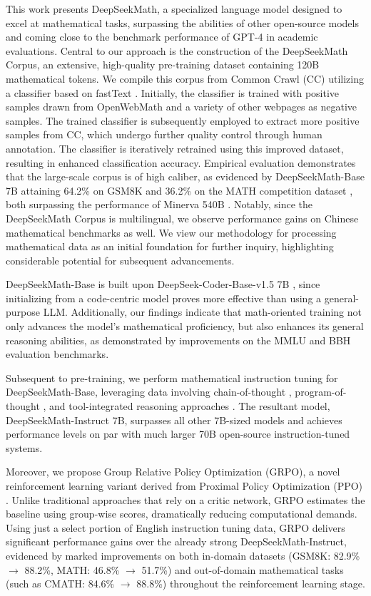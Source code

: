 This work presents DeepSeekMath, a specialized language model designed to excel at mathematical tasks, surpassing the abilities of other open-source models and coming close to the benchmark performance of GPT-4 in academic evaluations. Central to our approach is the construction of the DeepSeekMath Corpus, an extensive, high-quality pre-training dataset containing 120B mathematical tokens. We compile this corpus from Common Crawl (CC) utilizing a classifier based on fastText \citep{joulin2016fasttext}. Initially, the classifier is trained with positive samples drawn from OpenWebMath \citep{openwebmath} and a variety of other webpages as negative samples. The trained classifier is subsequently employed to extract more positive samples from CC, which undergo further quality control through human annotation. The classifier is iteratively retrained using this improved dataset, resulting in enhanced classification accuracy. Empirical evaluation demonstrates that the large-scale corpus is of high caliber, as evidenced by DeepSeekMath-Base 7B attaining 64.2\% on GSM8K \citep{gsm8k} and 36.2\% on the MATH competition dataset \citep{MATH}, both surpassing the performance of Minerva 540B \citep{minerva}. Notably, since the DeepSeekMath Corpus is multilingual, we observe performance gains on Chinese mathematical benchmarks \citep{wei2023cmath,agieval} as well. We view our methodology for processing mathematical data as an initial foundation for further inquiry, highlighting considerable potential for subsequent advancements.

DeepSeekMath-Base is built upon DeepSeek-Coder-Base-v1.5 7B \citep{deepseek-coder}, since initializing from a code-centric model proves more effective than using a general-purpose LLM. Additionally, our findings indicate that math-oriented training not only advances the model's mathematical proficiency, but also enhances its general reasoning abilities, as demonstrated by improvements on the MMLU \citep{mmlu} and BBH \citep{bbh} evaluation benchmarks.

Subsequent to pre-training, we perform mathematical instruction tuning for DeepSeekMath-Base, leveraging data involving chain-of-thought \citep{cot}, program-of-thought \citep{pot,pal}, and tool-integrated reasoning approaches \citep{tora}. The resultant model, DeepSeekMath-Instruct 7B, surpasses all other 7B-sized models and achieves performance levels on par with much larger 70B open-source instruction-tuned systems.

Moreover, we propose Group Relative Policy Optimization (GRPO), a novel reinforcement learning variant derived from Proximal Policy Optimization (PPO) \citep{schulman2017proximal}. Unlike traditional approaches that rely on a critic network, GRPO estimates the baseline using group-wise scores, dramatically reducing computational demands. Using just a select portion of English instruction tuning data, GRPO delivers significant performance gains over the already strong DeepSeekMath-Instruct, evidenced by marked improvements on both in-domain datasets (GSM8K: 82.9\% $\rightarrow$ 88.2\%, MATH: 46.8\% $\rightarrow$ 51.7\%) and out-of-domain mathematical tasks (such as CMATH: 84.6\% $\rightarrow$ 88.8\%) throughout the reinforcement learning stage. 

